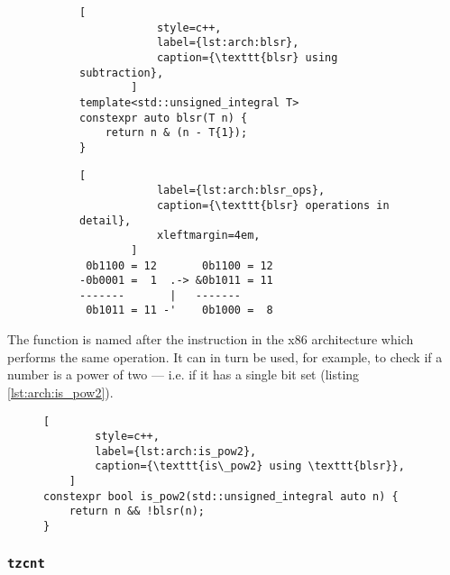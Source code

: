 \begin{figure}[ht]
    \centering
    \vspace{-\baselineskip}
    \begin{subfigure}[t]{0.45\textwidth}
        \begin{lstlisting}[
            style=c++,
            label={lst:arch:blsr},
            caption={\texttt{blsr} using subtraction},
        ]
template<std::unsigned_integral T>
constexpr auto blsr(T n) {
    return n & (n - T{1});
}
        \end{lstlisting}
    \end{subfigure}
    \begin{subfigure}[t]{0.45\textwidth}
        \begin{lstlisting}[
            label={lst:arch:blsr_ops},
            caption={\texttt{blsr} operations in detail},
            xleftmargin=4em,
        ]
 0b1100 = 12       0b1100 = 12
-0b0001 =  1  .-> &0b1011 = 11
-------       |   -------
 0b1011 = 11 -'    0b1000 =  8
        \end{lstlisting}
    \end{subfigure}
    \vspace{-\baselineskip}
\end{figure}

The function is named after the instruction in the x86 architecture which
performs the same operation.  It can in turn be used, for example, to check if a
number is a power of two --- i.e. if it has a single bit set (listing
\ref{lst:arch:is_pow2}).

\begin{figure}[ht]
    \vspace{-\baselineskip}
    \begin{lstlisting}[
        style=c++,
        label={lst:arch:is_pow2},
        caption={\texttt{is\_pow2} using \texttt{blsr}},
    ]
constexpr bool is_pow2(std::unsigned_integral auto n) {
    return n && !blsr(n);
}
    \end{lstlisting}
    \vspace{-2\baselineskip}
\end{figure}

\subsubsection{\texttt{tzcnt}}

